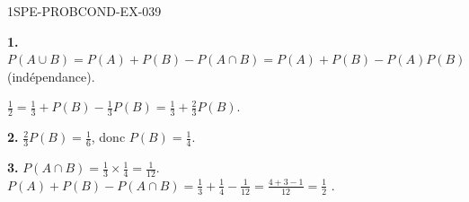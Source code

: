\begin{corrige}{1SPE-PROBCOND-EX-039}

\textbf{1.} $P(A \cup B) = P(A) + P(B) - P(A \cap B) = P(A) + P(B) - P(A)P(B)$ (indépendance).

$\frac{1}{2} = \frac{1}{3} + P(B) - \frac{1}{3}P(B) = \frac{1}{3} + \frac{2}{3}P(B)$.

\textbf{2.} $\frac{2}{3}P(B) = \frac{1}{6}$, donc $P(B) = \frac{1}{4}$.

\textbf{3.} $P(A \cap B) = \frac{1}{3} \times \frac{1}{4} = \frac{1}{12}$. $P(A)+P(B)-P(A \cap B) = \frac{1}{3}+\frac{1}{4}-\frac{1}{12} = \frac{4+3-1}{12} = \frac{1}{2}$ \checkmark.

\end{corrige}
